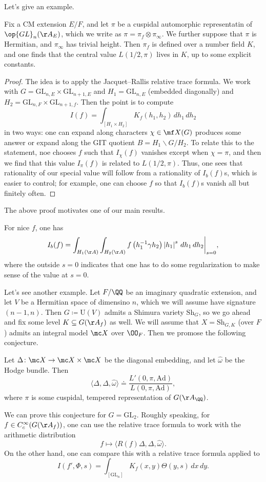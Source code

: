\documentclass{article}
\begin{document}
Let's give an example.
\begin{theorem}
	Fix a CM extension $E/F$, and let $\pi$ be a cuspidal automorphic representatin of $\op{GL}_n(\AA_E)$, which we write as $\pi=\pi_f\otimes\pi_\infty$. We further suppose that $\pi$ is Hermitian, and $\pi_\infty$ has trivial height. Then $\pi_f$ is defined over a number field $K$, and one finds that the central value $L(1/2,\pi)$ lives in $K$, up to some explicit constants.
\end{theorem}
\begin{proof}
	The idea is to apply the Jacquet--Rallis relative trace formula. We work with $G=\mathrm{GL}_{n,E}\times\mathrm{GL}_{n+1,E}$ and $H_1=\mathrm{GL}_{n,E}$ (embedded diagonally) and $H_2=\mathrm{GL}_{n,F}\times\mathrm{GL}_{n+1,f}$. Then the point is to compute
	\[I(f)=\int_{[H_1\times H_2]}K_f(h_1,h_2)\,dh_1\,dh_2\]
	in two ways: one can expand along characters $\chi\in\mf X(G)$ produces some answer or expand along the GIT quotient $B=H_1\backslash G/H_2$. To relate this to the statement, noe chooses $f$ such that $I_\chi(f)$ vanishes except when $\chi=\pi$, and then we find that this value $I_\pi(f)$ is related to $L(1/2,\pi)$. Thus, one sees that rationality of our special value will follow from a rationality of $I_b(f)$s, which is easier to control; for example, one can choose $f$ so that $I_b(f)$s vanish all but finitely often.
\end{proof}
The above proof motivates one of our main results.
\begin{theorem}[L]
	For nice $f$, one has
	\[I_b(f)=\int_{H_1(\AA)}\int_{H_2(\AA)}f\left(h_1^{-1}\gamma h_2\right)\left|h_1\right|^s\,dh_1\,dh_2\bigg|_{s=0},\]
	where the outside $s=0$ indicates that one has to do some regularization to make sense of the value at $s=0$.
\end{theorem}
Let's see another example. Let $F/\QQ$ be an imaginary quadratic extension, and let $V$ be a Hermitian space of dimensino $n$, which we will assume have signature $(n-1,n)$. Then $G\coloneqq\mathrm U(V)$ admits a Shimura variety $\mathrm{Sh}_G$, so we go ahead and fix some level $K\subseteq G(\AA_f)$ as well. We will assume that $X=\mathrm{Sh}_{G,K}$ (over $F$) admits an integral model $\mc X$ over $\OO_F$. Then we promose the following conjecture.
\begin{conj}
	Let $\Delta\colon\mc X\to\mc X\times\mc X$ be the diagonal embedding, and let $\widehat\omega$ be the Hodge bundle. Then
	\[\langle\Delta,\Delta,\widehat\omega\rangle\doteq\frac{L'(0,\pi,\mathrm{Ad})}{L(0,\pi,\mathrm{Ad})},\]
	where $\pi$ is some cuspidal, tempered representation of $G(\AA_\QQ)$.
\end{conj}
We can prove this conjecture for $G=\mathrm{GL}_2$. Roughly speaking, for $f\in C_c^\infty(G(\AA_f))$, one can use the relative trace formula to work with the arithmetic distribution
\[f\mapsto\langle R(f)\Delta,\Delta,\widehat\omega\rangle.\]
On the other hand, one can compare this with a relative trace formula applied to
\[I(f',\Phi,s)=\int_{[\mathrm{GL}_n]}K_f(x,y)\Theta(y,s)\,dx\,dy.\]
\end{document}
